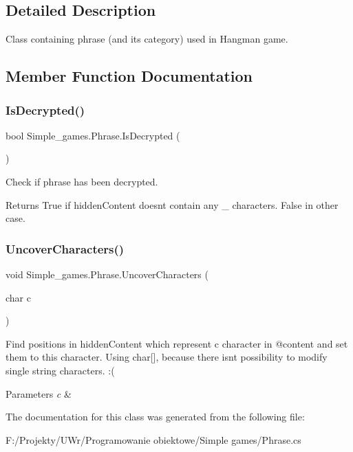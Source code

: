 \subsection{Detailed Description}
Class containing phrase (and its category) used in Hangman game. 



\subsection{Member Function Documentation}
\mbox{\label{class_simple__games_1_1_phrase_a27c0d580bedd3c52c49e3f3d359768eb}} 
\subsubsection{IsDecrypted()}
{\footnotesize\ttfamily bool Simple\+\_\+games.\+Phrase.\+Is\+Decrypted (\begin{DoxyParamCaption}{ }\end{DoxyParamCaption})}



Check if phrase has been decrypted. 

\begin{DoxyReturn}{Returns}
True if hidden\+Content doesn\textquotesingle{}t contain any \textquotesingle{}\+\_\+\textquotesingle{} characters. False in other case.
\end{DoxyReturn}
\mbox{\label{class_simple__games_1_1_phrase_a2abb90bb41cd0333c164b8d8ab6fa36a}} 
\subsubsection{UncoverCharacters()}
{\footnotesize\ttfamily void Simple\+\_\+games.\+Phrase.\+Uncover\+Characters (\begin{DoxyParamCaption}\item[{char}]{c }\end{DoxyParamCaption})}



Find positions in hidden\+Content which represent c character in @content and set them to this character. Using char[], because there isn\textquotesingle{}t possibility to modify single string characters. \+:( 


\begin{DoxyParams}{Parameters}
{\em c} & \\
\hline
\end{DoxyParams}


The documentation for this class was generated from the following file\+:\begin{DoxyCompactItemize}
\item 
F\+:/\+Projekty/\+U\+Wr/\+Programowanie obiektowe/\+Simple games/Phrase.\+cs\end{DoxyCompactItemize}
